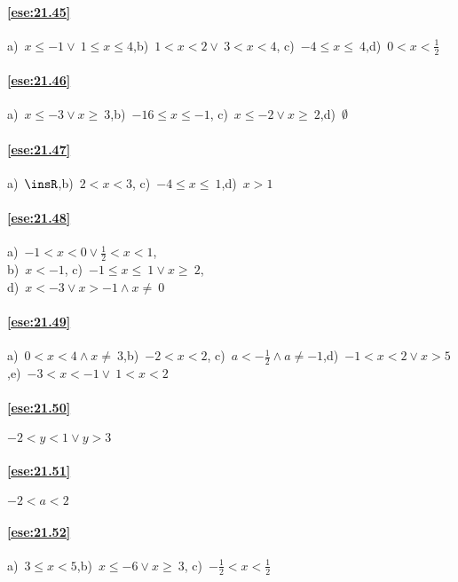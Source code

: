 \begin{multicols}{2}
\paragraph{\ref{ese:21.45}} a)~\(x\le -1\vee~1\le x\le4\),\quad b)~\(1<x<2\vee~3<x<4\),\quad
c)~\(-4\le x\le~4\),\quad d)~\(0<x<\frac{1}{2}\)

\paragraph{\ref{ese:21.46}} a)~\(x\le -3\vee x\ge~3\),\quad b)~\(-16\le x\le -1\),\quad
c)~\(x\le -2\vee x\ge~2\),\quad d)~\(\emptyset \)

\paragraph{\ref{ese:21.47}} a)~\(\insR\),\quad b)~\(2<x<3\),\quad
c)~\(-4\le x\le~1\),\quad d)~\(x>1\)

\paragraph{\ref{ese:21.48}} a)~\(-1<x<0\vee \frac{1}{2}<x<1\),\quad \protect\\ b)~\(x<-1\),\quad
c)~\(-1\le x\le~1\vee x\ge~2\),\quad \protect\\ d)~\(x<-3\vee x>-1\wedge x\neq~0\)

\paragraph{\ref{ese:21.49}} a)~\(0<x<4\wedge x\neq~3\),\quad b)~\(-2<x<2\),\quad
c)~\(a<-{\frac{1}{2}}\wedge a\neq -1\),\quad d)~\(-1<x<2\vee x>5\),\quad e)~\(-3<x<-1\vee~1<x<2\)

\paragraph{\ref{ese:21.50}} \(-2<y<1\vee y>3\)

\paragraph{\ref{ese:21.51}} \(-2<a<2\)

\paragraph{\ref{ese:21.52}} a)~\(3\le x<5\),\quad b)~\(x\le -6\vee x\ge~3\),\quad
c)~\(-{\frac{1}{2}}<x<\frac{1}{2}\)


\end{multicols}
